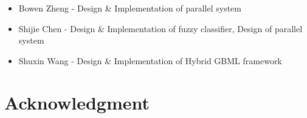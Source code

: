 \documentclass[conference]{IEEEtran}
\begin{document}
    \begin{itemize}
    \item Bowen Zheng - Design \& Implementation of parallel system
    \item Shijie Chen - Design \& Implementation of fuzzy classifier, Design of parallel system
    \item Shuxin Wang - Design \& Implementation of Hybrid GBML framework
    \end{itemize}
    

  \section*{Acknowledgment}




\end{document}
